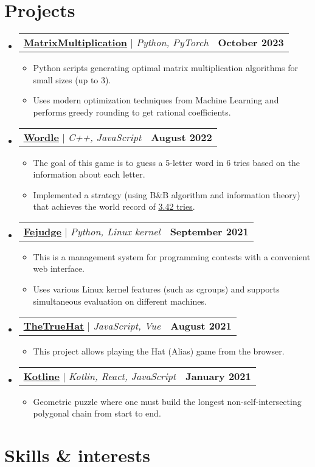 \documentclass[letterpaper,11pt]{article}
\makeatletter
\newcommand{\resumeProjectHeading}[3]{
	\item
	\begin{tabular*}{1.0\textwidth}{l@{\extracolsep{\fill}}r}
		\textbf{\small #1} $|$ \emph{\small #2} & \textbf{\small #3} \\
	\end{tabular*}\vspace{-7pt}
}
\newcommand{\resumeSubHeadingListStart}{\begin{itemize}[leftmargin=0.0in, label={}]}
\newcommand{\resumeSubHeadingListEnd}{\end{itemize}}
\newcommand{\resumeItemListStart}{\begin{itemize}}
\newcommand{\resumeItemListEnd}{\end{itemize}\vspace{-8pt}}
\newcommand{\resumeItem}[1]{\item\small{{#1 \vspace{-2pt}}}}
\makeatother
\begin{document}
\section{Projects}

\resumeSubHeadingListStart

\resumeProjectHeading
{\href{https://github.com/Qock-Foundation/matrix-multiplication}{\underline{MatrixMultiplication}}}{Python, PyTorch}{October 2023}
\resumeItemListStart
\resumeItem{Python scripts generating optimal matrix multiplication algorithms for small sizes (up to 3).}
\resumeItem{Uses modern optimization techniques from Machine Learning and performs greedy rounding to get rational coefficients.}
\resumeItemListEnd

\resumeProjectHeading
{\href{https://github.com/kuyanov/wordle}{\underline{Wordle}}}{C++, JavaScript}{August 2022}
\resumeItemListStart
\resumeItem{The goal of this game is to guess a 5-letter word in 6 tries based on the information about each letter.}
\resumeItem{Implemented a strategy (using B\&B algorithm and information theory) that achieves the world record of \href{https://auction-upload-files.s3.amazonaws.com/Wordle_Paper_Final.pdf}{\underline{3.42 tries}}.}
\resumeItemListEnd

\resumeProjectHeading
{\href{https://github.com/m20-sch57/fejudge}{\underline{Fejudge}}}{Python, Linux kernel}{September 2021}
\resumeItemListStart
\resumeItem{This is a management system for programming contests with a convenient web interface.}
\resumeItem{Uses various Linux kernel features (such as cgroups) and supports simultaneous evaluation on different machines.}
\resumeItemListEnd

\resumeProjectHeading
{\href{https://github.com/m20-sch57/thetruehat}{\underline{TheTrueHat}}}{JavaScript, Vue}{August 2021}
\resumeItemListStart
\resumeItem{This project allows playing the Hat (Alias) game from the browser.}
\resumeItemListEnd

\resumeProjectHeading
{\href{https://github.com/JaggedLine/kotline}{\underline{Kotline}}}{Kotlin, React, JavaScript}{January 2021}
\resumeItemListStart
\resumeItem{Geometric puzzle where one must build the longest non-self-intersecting polygonal chain from start to end.}
\resumeItemListEnd

\resumeSubHeadingListEnd


\section{Skills \& interests}
\end{document}
